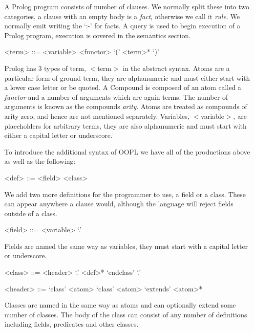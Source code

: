 \documentclass[12pt,a4paper,twoside,openright]{report}
\begin{document}
A Prolog program consists of number of clauses. We normally split these into two categories, a clause with an empty body is a \emph{fact}, otherwise we call it \emph{rule}. We normally emit writing the `:-' for facts. A query is used to begin execution of a Prolog program, execution is covered in the semantics section.

\begin{grammar}	
				
<term> ::= <variable>
\alt <functor> `(' <term>* `)'

\end{grammar}

Prolog has 3 types of term,  $<$term$>$ in the abstract syntax. Atoms are a particular form of ground term, they are alphanumeric and must either start with a lower case letter or be quoted. A Compound is composed of an atom called a \emph{functor} and a number of arguments which are again terms. The number of arguments is known as the compounds \emph{arity}. Atoms are treated as compounds of arity zero, and hence are not mentioned separately. Variables, $<$variable$>$, are placeholders for arbitrary terms, they are also alphanumeric and must start with either a capital letter or underscore.

\bigskip

To introduce the additional syntax of OOPL we have all of the productions above as well as the following:

\begin{grammar}
<def> ::= <field>
\alt <class>
\end{grammar}

We add two more definitions for the programmer to use, a field or a class. These can appear anywhere a clause would, although the language will reject fields outside of a class.

\begin{grammar}
<field> ::= <variable> `.'
\end{grammar}

Fields are named the same way as variables, they must start with a capital letter or underscore.

\begin{grammar}
<class> ::= <header> `.' <def>* `endclass' `.'

<header> ::= `class' <atom>
\alt `class' <atom> `extends' <atom>*
\end{grammar}

Classes are named in the same way as atoms and can optionally extend some number of classes. The body of the class can consist of any number of definitions including fields, predicates and other classes. 
\end{document}
